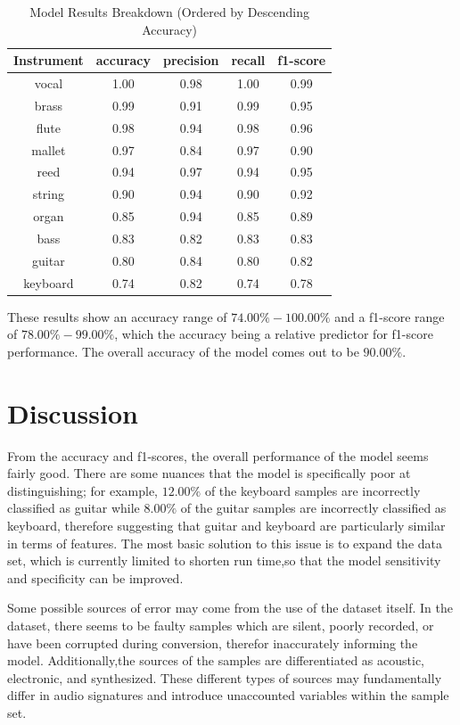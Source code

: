 \documentclass{article}
\begin{document}
\begin{table}[htb]
  \caption{Model Results Breakdown (Ordered by Descending Accuracy)}
  \label{results-table}
  \centering
  \begin{tabular}{ccccc}
    \toprule
    Instrument & accuracy & precision & recall & f1-score  \\
    \midrule
    vocal & 1.00 & 0.98 & 1.00 & 0.99\\
    brass & 0.99 & 0.91 & 0.99 & 0.95\\
    flute & 0.98 & 0.94 & 0.98 & 0.96\\
    mallet & 0.97 & 0.84 & 0.97 & 0.90\\
    reed & 0.94 & 0.97 & 0.94 & 0.95\\
    string & 0.90 & 0.94 & 0.90 & 0.92\\
    organ & 0.85 & 0.94 & 0.85 & 0.89\\
    bass & 0.83 & 0.82 & 0.83 & 0.83\\
    guitar & 0.80 & 0.84 & 0.80 & 0.82\\
    keyboard & 0.74 & 0.82 & 0.74 & 0.78\\
    \bottomrule
  \end{tabular}
\end{table}

These results show an accuracy range of $74.00\%-100.00\%$ and a f1-score range of $78.00\%-99.00\%$, which the accuracy being a relative predictor for f1-score performance. The overall accuracy of the model comes out to be $90.00\%$.

\section{Discussion}

From the accuracy and f1-scores, the overall performance of the model seems fairly good. There are some nuances that the model is specifically poor at distinguishing; for example, $12.00\%$ of the keyboard samples are incorrectly classified as guitar while $8.00\%$ of the guitar samples are incorrectly classified as keyboard, therefore suggesting that guitar and keyboard are particularly similar in terms of features. The most basic solution to this issue is to expand the data set, which is currently limited to shorten run time,so that the model sensitivity and specificity can be improved.

Some possible sources of error may come from the use of the dataset itself. In the dataset, there seems to be faulty samples which are silent, poorly recorded, or have been corrupted during conversion, therefor inaccurately informing the model. Additionally,the sources of the samples are differentiated as acoustic, electronic, and synthesized. These different types of sources may fundamentally differ in audio signatures and introduce unaccounted variables within the sample set.
\end{document}
